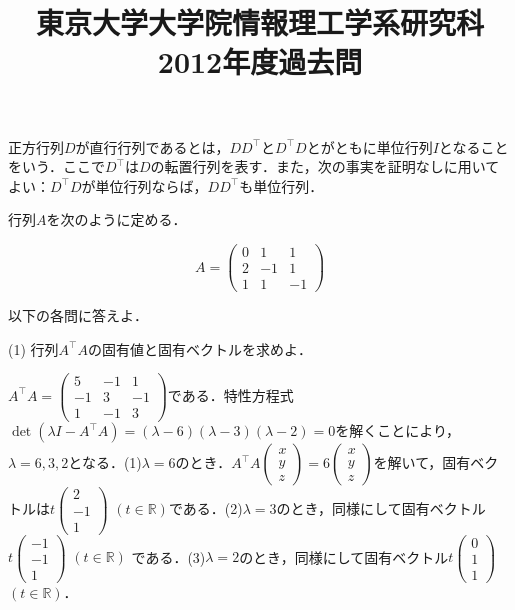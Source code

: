\documentclass[a4j]{jarticle}
\title{東京大学大学院情報理工学系研究科2012年度過去問}
\author{}
\date{}
\begin{document}
\thispagestyle{empty}
\maketitle
\pagebreak

\section{}

\begin{screen}
正方行列$D$が直行行列であるとは，$DD^\top$と$D^\top D$とがともに単位行列$I$となることをいう．ここで$D^\top$は$D$の転置行列を表す．また，次の事実を証明なしに用いてよい：$D^\top D$が単位行列ならば，$DD^\top$も単位行列．

行列$A$を次のように定める．

$$A=
\begin{pmatrix}
0 & 1 & 1 \\
2 & -1 & 1 \\
1 & 1 & -1
\end{pmatrix}$$

以下の各問に答えよ．
\end{screen}

\begin{screen}
(1)
行列$A^\top A$の固有値と固有ベクトルを求めよ．
\end{screen}

$A^\top A=
\begin{pmatrix}
5& -1&  1\\
-1&  3& -1\\
 1& -1&  3
\end{pmatrix}$$
$である．特性方程式$\det(\lambda I -A^\top A)=(\lambda-6)(\lambda-3)(\lambda-2)=0$を解くことにより，$\lambda = 6,3,2$となる．(1)$\lambda=6$のとき．$A^\top A\left(\begin{array}{c} x \\ y \\ z \end{array} \right) = 6\left(\begin{array}{c} x \\ y \\ z \end{array} \right)$を解いて，固有ベクトルは$t\left(\begin{array}{c} 2 \\ -1 \\ 1 \end{array} \right)$ $(t\in \mathbb{R})$である．(2)$\lambda=3$のとき，同様にして固有ベクトル$t\left(\begin{array}{c} -1 \\ -1 \\ 1 \end{array} \right)$ $(t\in \mathbb{R})$ である．(3)$\lambda=2$のとき，同様にして固有ベクトル$t\left(\begin{array}{c} 0\\ 1 \\ 1 \end{array} \right)$ $(t\in \mathbb{R})$．
\end{document}

